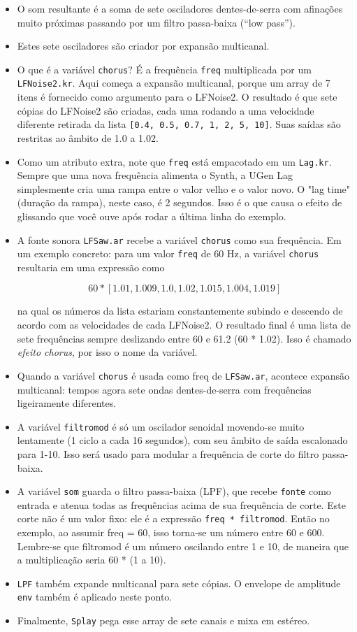 \begin{itemize}
\item O som resultante é a soma de sete osciladores dentes-de-serra com afinações muito próximas passando por um filtro passa-baixa (“low pass”).
\item Estes sete osciladores são criador por expansão multicanal.
\item O que é a variável \texttt{chorus}? É a frequência \texttt{freq} multiplicada por um \texttt{LFNoise2.kr}. Aqui começa a expansão multicanal, porque um array de 7 itens é fornecido como argumento para o LFNoise2. O resultado é que sete cópias do LFNoise2 são criadas, cada uma rodando a uma velocidade diferente retirada da lista \texttt{[0.4, 0.5, 0.7, 1, 2, 5, 10]}. Suas saídas são restritas ao âmbito de 1.0 a 1.02.
\item Como um atributo extra, note que \texttt{freq} está empacotado em um \texttt{Lag.kr}. Sempre que uma nova frequência alimenta o Synth, a UGen Lag simplesmente cria uma rampa entre o valor velho e o valor novo. O "lag time" (duração da rampa), neste caso, é 2 segundos. Isso é o que causa o efeito de glissando que você ouve após rodar a última linha do exemplo.  
\item A fonte sonora \texttt{LFSaw.ar} recebe a variável \texttt{chorus} como sua frequência. Em um exemplo concreto: para um valor \texttt{freq} de 60 Hz, a variável \texttt{chorus} resultaria em uma expressão como

$$60 * [1.01, 1.009, 1.0, 1.02, 1.015, 1.004, 1.019]$$

na qual os números da lista estariam constantemente subindo e descendo de acordo com as velocidades de cada LFNoise2. O resultado final é uma lista de sete frequências sempre deslizando entre 60 e 61.2 (60 * 1.02). Isso é chamado \textit{efeito chorus}, por isso o nome da variável. 
\item Quando a variável \texttt{chorus} é usada como freq de \texttt{LFSaw.ar}, acontece expansão multicanal: tempos agora sete ondas dentes-de-serra com frequências ligeiramente diferentes.
\item A variável \texttt{filtromod} é só um oscilador senoidal movendo-se muito lentamente (1 ciclo a cada 16 segundos), com seu âmbito de saída escalonado para 1-10. Isso será usado para modular a frequência de corte do filtro passa-baixa.
\item A variável \texttt{som} guarda o filtro passa-baixa (LPF), que recebe \texttt{fonte} como entrada e atenua todas as frequências acima de sua frequência de corte. Este corte não é um valor fixo: ele é a expressão \texttt{freq * filtromod}. Então no exemplo, ao assumir freq = 60, isso torna-se um número entre 60 e 600. Lembre-se que filtromod é um número oscilando entre 1 e 10, de maneira que a multiplicação seria 60 * (1 a 10).
\item \texttt{LPF} também expande multicanal para sete cópias. O envelope de amplitude \texttt{env} também é aplicado neste ponto.
\item Finalmente, \texttt{Splay} pega esse array de sete canais e mixa em estéreo.

\end{itemize}
 
